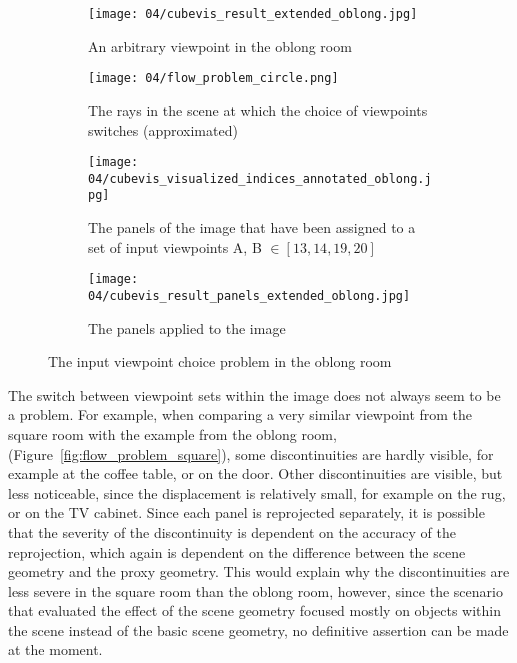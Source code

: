 \begin{figure}
\centering
    \hfill
    \begin{subfigure}[c]{0.45\textwidth}
            \centering
            \texttt{[image: 04/cubevis\_result\_extended\_oblong.jpg]}
            \caption{An arbitrary viewpoint in the oblong room}
    \end{subfigure}
    \hfill
    \begin{subfigure}[c]{0.45\textwidth}
            \centering
            \texttt{[image: 04/flow\_problem\_circle.png]}
            \caption{The rays in the scene at which the choice of viewpoints switches (approximated)}
    \end{subfigure}
    \hfill

    \hfill
    \begin{subfigure}[c]{0.45\textwidth}
            \centering
            \texttt{[image: 04/cubevis\_visualized\_indices\_annotated\_oblong.jpg]}
            \caption{The panels of the image that have been assigned to a set of input viewpoints A, B $\in [13, 14, 19, 20]$}
    \end{subfigure}
    \hfill
    \begin{subfigure}[c]{0.45\textwidth}
            \centering
            \texttt{[image: 04/cubevis\_result\_panels\_extended\_oblong.jpg]}
            \caption{The panels applied to the image}
    \end{subfigure}
    \hfill
  \caption{The input viewpoint choice problem in the oblong room} \label{fig:flow_problem_oblong}
\end{figure}

The switch between viewpoint sets within the image does not always seem to be a problem. For example, when comparing a very similar viewpoint from the square room with the example from the oblong room, (Figure~\ref{fig:flow_problem_square}), some discontinuities are hardly visible, for example at the coffee table, or on the door. Other discontinuities are visible, but less noticeable, since the displacement is relatively small, for example on the rug, or on the TV cabinet.
Since each panel is reprojected separately, it is possible that the severity of the discontinuity is dependent on the accuracy of the reprojection, which again is dependent on the difference between the scene geometry and the proxy geometry.
This would explain why the discontinuities are less severe in the square room than the oblong room, however, 
since the scenario that evaluated the effect of the scene geometry focused mostly on objects within the scene instead of the basic scene geometry, no definitive assertion can be made at the moment. %

